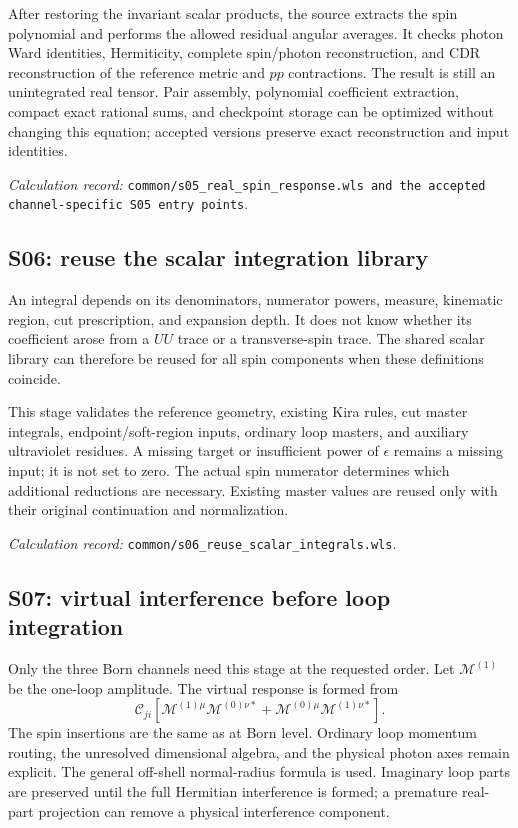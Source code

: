 \documentclass[11pt,a4paper]{article}
\newcommand{\eps}{\epsilon}
\newcommand{\code}[1]{{\small\nolinkurl{#1}}}
\newcommand{\pathref}[1]{\par{\footnotesize\textit{Calculation record:} \code{#1}.}\par}
\begin{document}
After restoring the invariant scalar products, the source extracts the spin polynomial and performs the allowed residual angular averages. It checks photon Ward identities, Hermiticity, complete spin/photon reconstruction, and CDR reconstruction of the reference metric and $pp$ contractions. The result is still an unintegrated real tensor. Pair assembly, polynomial coefficient extraction, compact exact rational sums, and checkpoint storage can be optimized without changing this equation; accepted versions preserve exact reconstruction and input identities.
\pathref{common/s05_real_spin_response.wls and the accepted channel-specific S05 entry points}

\subsection{S06: reuse the scalar integration library}
An integral depends on its denominators, numerator powers, measure, kinematic region, cut prescription, and expansion depth. It does not know whether its coefficient arose from a $UU$ trace or a transverse-spin trace. The shared scalar library can therefore be reused for all spin components when these definitions coincide.

This stage validates the reference geometry, existing Kira rules, cut master integrals, endpoint/soft-region inputs, ordinary loop masters, and auxiliary ultraviolet residues. A missing target or insufficient power of $\eps$ remains a missing input; it is not set to zero. The actual spin numerator determines which additional reductions are necessary. Existing master values are reused only with their original continuation and normalization.
\pathref{common/s06_reuse_scalar_integrals.wls}

\subsection{S07: virtual interference before loop integration}
Only the three Born channels need this stage at the requested order. Let $\mathcal M^{(1)}$ be the one-loop amplitude. The virtual response is formed from
\begin{equation}
 \mathcal C_{ji}\!\left[
 \mathcal M^{(1)\mu}\mathcal M^{(0)\nu *}
 +\mathcal M^{(0)\mu}\mathcal M^{(1)\nu *}\right].
\end{equation}
The spin insertions are the same as at Born level. Ordinary loop momentum routing, the unresolved dimensional algebra, and the physical photon axes remain explicit. The general off-shell normal-radius formula is used. Imaginary loop parts are preserved until the full Hermitian interference is formed; a premature real-part projection can remove a physical interference component.
\end{document}
